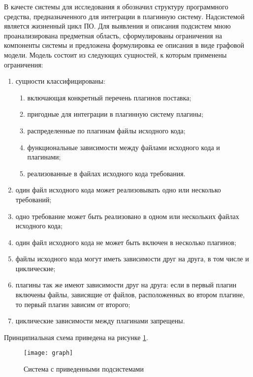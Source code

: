 
В качесте системы для исследования я обозначил структуру программного средства, предназначенного для интеграции в плагинную систему. Надсистемой является жизненный цикл ПО. Для выявления и описания подсистем мною проанализирована предметная область, сформулированы ограничения на компоненты системы и предложена формулировка ее описания в виде графовой модели. Модель состоит из следующих сущностей, к которым применены ограничения:
\begin{enumerate}
    \item сущности классифицированы:
    \begin{enumerate}
        \item включающая конкретный перечень плагинов поставка;
        \item пригодные для интеграции в плагинную систему плагины;
        \item распределенные по плагинам файлы исходного кода;
        \item функциональные зависимости между файлами исходного кода и плагинами;
        \item реализованные в файлах исходного кода требования.
    \end{enumerate}
    \item один файл исходного кода может реализовывать одно или несколько требований;
    \item одно требование может быть реализовано в одном или нескольких файлах исходного кода;
    \item один файл исходного кода не может быть включен в несколько плагинов;
    \item файлы исходного кода могут иметь зависимости друг на друга, в том числе и циклические;
    \item плагины так же имеют зависимости друг на друга: если в первый плагин включены файлы, зависящие от файлов, расположенных во втором плагине, то первый плагин зависим от второго;
    \item циклические зависимости между плагинами запрещены.
\end{enumerate}

Принципиальная схема приведена на рисунке \ref{fig:graph}.

\begin{figure}[H]
    \centering
    \texttt{[image: graph]}
    \caption{Система с приведенными подсистемами}
    \label{fig:graph}
\end{figure}

